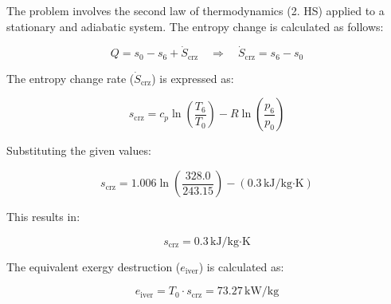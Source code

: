 The problem involves the second law of thermodynamics (2. HS) applied to a stationary and adiabatic system. The entropy change is calculated as follows:

\[
Q = s_0 - s_6 + \dot{S}_{\text{crz}} \quad \Rightarrow \quad \dot{S}_{\text{crz}} = s_6 - s_0
\]

The entropy change rate (\( \dot{S}_{\text{crz}} \)) is expressed as:

\[
s_{\text{crz}} = c_{p} \ln \left( \frac{T_6}{T_0} \right) - R \ln \left( \frac{p_6}{p_0} \right)
\]

Substituting the given values:

\[
s_{\text{crz}} = 1.006 \ln \left( \frac{328.0}{243.15} \right) - (0.3 \, \text{kJ/kg·K})
\]

This results in:

\[
s_{\text{crz}} = 0.3 \, \text{kJ/kg·K}
\]

The equivalent exergy destruction (\( e_{\text{iver}} \)) is calculated as:

\[
e_{\text{iver}} = T_0 \cdot s_{\text{crz}} = 73.27 \, \text{kW/kg}
\]